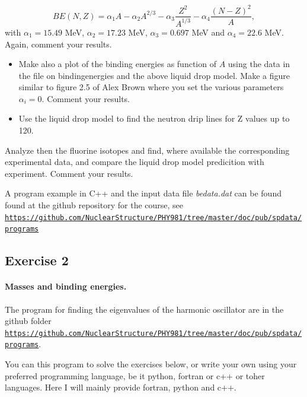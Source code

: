 \documentclass[%
twoside,                 %
final,                   %
10pt]{article}
\begin{document}
\noindent
\[
BE(N,Z)= \alpha_1A-\alpha_2A^{2/3}-\alpha_3\frac{Z^2}{A^{1/3}}-\alpha_4\frac{(N-Z)^2}{A},
\]
with $\alpha_1=15.49$ MeV, $\alpha_2=17.23$ MeV, $\alpha_3=0.697$ MeV and $\alpha_4=22.6$ MeV.
Again, comment your results. 
\begin{itemize}
 \item Make also a plot of the binding energies as function of $A$ using the data in the file on bindingenergies and the above liquid drop model.  Make a figure similar to figure 2.5 of Alex Brown where you set the various parameters $\alpha_i=0$. Comment your results. 

 \item Use the liquid drop model to find the neutron drip lines   for Z values up to 120.
\end{itemize}

\noindent
Analyze then the fluorine isotopes and find, where available the corresponding experimental data, and compare the liquid drop model predicition with experiment. 
Comment your results.

A program example in C++ and the input data file \emph{bedata.dat} can be found found at the github repository for the course, see \href{{https://github.com/NuclearStructure/PHY981/tree/master/doc/pub/spdata/programs}}{\nolinkurl{https://github.com/NuclearStructure/PHY981/tree/master/doc/pub/spdata/programs}}



\subsection*{Exercise 2}

\paragraph{Masses and binding energies.}
The program for finding the eigenvalues of the harmonic oscillator are in the github folder
\href{{https://github.com/NuclearStructure/PHY981/tree/master/doc/pub/spdata/programs}}{\nolinkurl{https://github.com/NuclearStructure/PHY981/tree/master/doc/pub/spdata/programs}}.

You can this program to solve the exercises below, or write your own using your preferred programming language, be it python, fortran or c++ or toher languages. Here I will mainly provide fortran, python and c++. 
\end{document}
